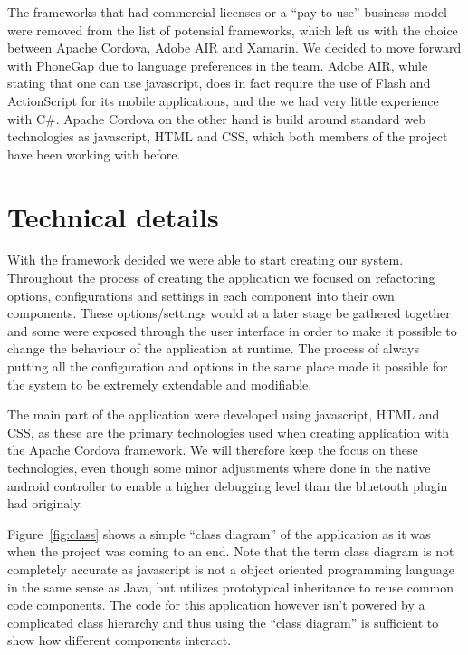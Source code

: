 	\bigskip\noindent
	The frameworks that had commercial licenses or a "`pay to use"' business model were removed from the list of potensial frameworks, which left us with the choice between Apache Cordova, Adobe AIR and Xamarin.
	We decided to move forward with PhoneGap due to language preferences in the team. Adobe AIR, while stating that one can use javascript, does in fact require the use of Flash and ActionScript for its mobile applications, and the we had very little experience with C\#.
	Apache Cordova on the other hand is build around standard web technologies as javascript, HTML and CSS, which both members of the project have been working with before.
	
\section{Technical details}
With the framework decided we were able to start creating our system. 
Throughout the process of creating the application we focused on refactoring options, configurations and settings in each component into their own components. These options/settings would at a later stage be gathered together and some were exposed through the user interface in order to make it possible to change the behaviour of the application at runtime. The process of always putting all the configuration and options in the same place made it possible for the system to be extremely extendable and modifiable. 

\bigskip\noindent
The main part of the application were developed using javascript, HTML and CSS, as these are the primary technologies used when creating application with the Apache Cordova framework. We will therefore keep the focus on these technologies, even though some minor adjustments where done in the native android controller to enable a higher debugging level than the bluetooth plugin had originaly.

\bigskip\noindent
Figure~\ref{fig:class} shows a simple "`class diagram"' of the application as it was when the project was coming to an end. Note that the term class diagram is not completely accurate as javascript is not a object oriented programming language in the same sense as Java, but utilizes prototypical inheritance to reuse common code components. The code for this application however isn't powered by a complicated class hierarchy and thus using the "`class diagram"' is sufficient to show how different components interact.


